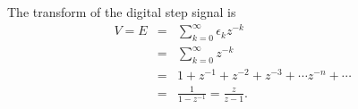 The transform of the digital step signal is
\begin{eqnarray}\label{eq:l10e6}
  V = E &=& \sum_{k=0}^{\infty}\epsilon_k z^{-k}\\
        &=& \sum_{k=0}^{\infty} z^{-k}\nonumber \\
        &=& 1 + z^{-1} + z^{-2} + z^{-3} + \cdots z^{-n} + \cdots \nonumber\\
        &=& \frac{1}{1-z^{-1}} = \frac{z}{z-1}.
\end{eqnarray}
\endinput
